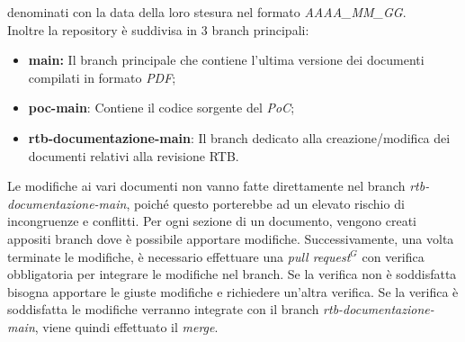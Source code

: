     denominati con la data della loro stesura nel formato \emph{AAAA\_MM\_GG}. \\
    Inoltre la repository è suddivisa in 3 branch principali:
    \begin{itemize}
        \item \textbf{main:} Il branch principale che contiene l'ultima versione dei documenti compilati in formato \emph{PDF};
        \item \textbf{poc-main}: Contiene il codice sorgente del \emph{PoC};
        \item \textbf{rtb-documentazione-main}: Il branch dedicato alla creazione/modifica dei documenti relativi alla  revisione RTB.
    \end{itemize}
    Le modifiche ai vari documenti non vanno fatte direttamente nel branch \emph{rtb-documentazione-main},
    poiché questo porterebbe ad un elevato rischio di incongruenze e conflitti. Per ogni sezione di un documento, vengono
    creati appositi branch dove è possibile apportare modifiche. Successivamente, una volta terminate le modifiche, è necessario 
    effettuare una \emph{pull request}$^{G}$ con verifica obbligatoria per integrare le modifiche nel branch. Se la verifica non è
    soddisfatta bisogna apportare le giuste modifiche e richiedere un'altra verifica. Se la verifica è
    soddisfatta le modifiche verranno integrate con il branch \emph{rtb-documentazione-main}, viene quindi effettuato il \emph{merge}. 